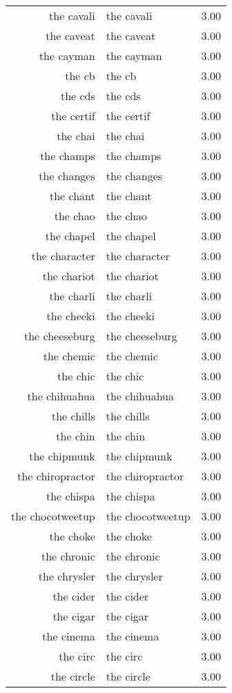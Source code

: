 \begin{table}[ht]
\begin{tabular}{rlr}
  the cavali & the cavali & 3.00 \\ 
  the caveat & the caveat & 3.00 \\ 
  the cayman & the cayman & 3.00 \\ 
  the cb & the cb & 3.00 \\ 
  the cds & the cds & 3.00 \\ 
  the certif & the certif & 3.00 \\ 
  the chai & the chai & 3.00 \\ 
  the champs & the champs & 3.00 \\ 
  the changes & the changes & 3.00 \\ 
  the chant & the chant & 3.00 \\ 
  the chao & the chao & 3.00 \\ 
  the chapel & the chapel & 3.00 \\ 
  the character & the character & 3.00 \\ 
  the chariot & the chariot & 3.00 \\ 
  the charli & the charli & 3.00 \\ 
  the cheeki & the cheeki & 3.00 \\ 
  the cheeseburg & the cheeseburg & 3.00 \\ 
  the chemic & the chemic & 3.00 \\ 
  the chic & the chic & 3.00 \\ 
  the chihuahua & the chihuahua & 3.00 \\ 
  the chills & the chills & 3.00 \\ 
  the chin & the chin & 3.00 \\ 
  the chipmunk & the chipmunk & 3.00 \\ 
  the chiropractor & the chiropractor & 3.00 \\ 
  the chispa & the chispa & 3.00 \\ 
  the chocotweetup & the chocotweetup & 3.00 \\ 
  the choke & the choke & 3.00 \\ 
  the chronic & the chronic & 3.00 \\ 
  the chrysler & the chrysler & 3.00 \\ 
  the cider & the cider & 3.00 \\ 
  the cigar & the cigar & 3.00 \\ 
  the cinema & the cinema & 3.00 \\ 
  the circ & the circ & 3.00 \\ 
  the circle & the circle & 3.00 \\ 

\end{tabular}
\end{table}
